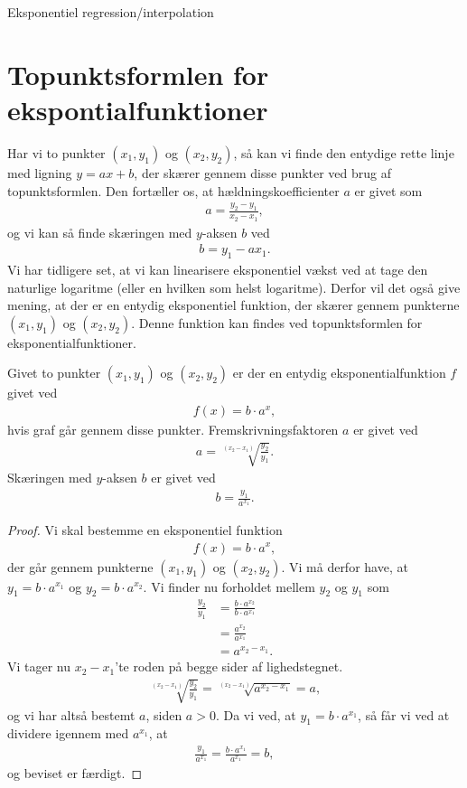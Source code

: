 
\begin{center}
\Huge
Eksponentiel regression/interpolation
\end{center}
\section*{Topunktsformlen for ekspontialfunktioner}
Har vi to punkter $(x_1,y_1)$ og $(x_2,y_2)$, så kan vi finde den entydige rette linje med ligning $y = ax + b$, der skærer gennem disse punkter ved brug af topunktsformlen. Den fortæller os, at hældningskoefficienter $a$ er givet som
\begin{align*}
a = \frac{y_2-y_1}{x_2-x_1},
\end{align*}
og vi kan så finde skæringen med $y$-aksen $b$ ved
\begin{align*}
b = y_1 - ax_1.
\end{align*}
Vi har tidligere set, at vi kan linearisere eksponentiel vækst ved at tage den naturlige logaritme (eller en hvilken som helst logaritme). Derfor vil det også give mening, at der er en entydig eksponentiel funktion, der skærer gennem punkterne $(x_1,y_1)$ og $(x_2,y_2)$. Denne funktion kan findes ved topunktsformlen for eksponentialfunktioner.
\begin{setn}
Givet to punkter $(x_1,y_1)$ og $(x_2,y_2)$ er der en entydig eksponentialfunktion $f$ givet ved
\begin{align*}
f(x) = b\cdot a^x,
\end{align*}
hvis graf går gennem disse punkter. Fremskrivningsfaktoren $a$ er givet ved
\begin{align*}
a=\sqrt[(x_2-x_1)]{\frac{y_2}{y_1}}.
\end{align*}
Skæringen med $y$-aksen $b$ er givet ved
\begin{align*}
b = \frac{y_1}{a^{x_1}}.
\end{align*}
\end{setn}
\begin{proof}
Vi skal bestemme en eksponentiel funktion
\begin{align*}
f(x) = b\cdot a^x, 
\end{align*}
der går gennem punkterne $(x_1,y_1)$ og $(x_2,y_2)$. Vi må derfor have, at $y_1 = b\cdot a^{x_1}$ og $y_2 = b\cdot a^{x_2}$. Vi finder nu forholdet mellem $y_2$ og $y_1$ som
\begin{align*}
\frac{y_2}{y_1} &= \frac{b\cdot a^{x_2}}{b\cdot a^{x_1}}\\
				&= \frac{a^{x_2}}{a^{x_1}}\\
				&=a^{x_2-x_1}.
\end{align*}
Vi tager nu $x_2-x_1$'te roden på begge sider af lighedstegnet.
\begin{align*}
\sqrt[(x_2-x_1)]{\frac{y_2}{y_1}} = \sqrt[(x_2-x_1)]{a^{x_2-x_1}} = a,
\end{align*}
og vi har altså bestemt $a$, siden $a>0$. Da vi ved, at $y_1 = b\cdot a^{x_1}$, så får vi ved at dividere igennem med $a^{x_1}$, at 
\begin{align*}
\frac{y_1}{a^{x_1}} = \frac{b\cdot a^{x_1}}{a^{x_1}} = b, 
\end{align*}
og beviset er færdigt. 
\end{proof}
